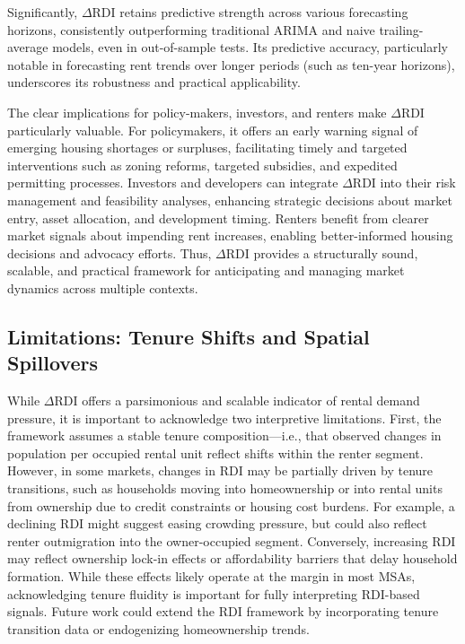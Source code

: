 \documentclass[APA,Times1COL]{WileyNJDv5} %
\begin{document}
Significantly, \(\Delta\text{RDI}\) retains predictive strength across various forecasting horizons, consistently outperforming traditional ARIMA and naive trailing-average models, even in out-of-sample tests. Its predictive accuracy, particularly notable in forecasting rent trends over longer periods (such as ten-year horizons), underscores its robustness and practical applicability.

The clear implications for policy-makers, investors, and renters make \(\Delta\text{RDI}\) particularly valuable. For policymakers, it offers an early warning signal of emerging housing shortages or surpluses, facilitating timely and targeted interventions such as zoning reforms, targeted subsidies, and expedited permitting processes. Investors and developers can integrate \(\Delta\text{RDI}\) into their risk management and feasibility analyses, enhancing strategic decisions about market entry, asset allocation, and development timing. Renters benefit from clearer market signals about impending rent increases, enabling better-informed housing decisions and advocacy efforts. Thus, \(\Delta\text{RDI}\) provides a structurally sound, scalable, and practical framework for anticipating and managing market dynamics across multiple contexts.

\subsection{Limitations: Tenure Shifts and Spatial Spillovers}

While \(\Delta\text{RDI}\) offers a parsimonious and scalable indicator of rental demand pressure, it is important to acknowledge two interpretive limitations. First, the framework assumes a stable tenure composition—i.e., that observed changes in population per occupied rental unit reflect shifts within the renter segment. However, in some markets, changes in RDI may be partially driven by tenure transitions, such as households moving into homeownership or into rental units from ownership due to credit constraints or housing cost burdens. For example, a declining RDI might suggest easing crowding pressure, but could also reflect renter outmigration into the owner-occupied segment. Conversely, increasing RDI may reflect ownership lock-in effects or affordability barriers that delay household formation. While these effects likely operate at the margin in most MSAs, acknowledging tenure fluidity is important for fully interpreting RDI-based signals. Future work could extend the RDI framework by incorporating tenure transition data or endogenizing homeownership trends.
\end{document}
